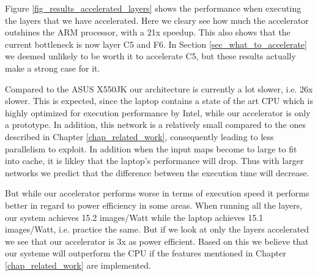Figure \ref{fig_results_accelerated_layers} shows the performance when executing the layers that we have accelerated. Here we cleary see how much the accelerator outshines the ARM processor, with a 21x speedup. This also shows that the current bottleneck is now layer C5 and F6. In Section \ref{sec_what_to_accelerate} we deemed unlikely to be worth it to accelerate C5, but these results actually make a strong case for it. 

Compared to the ASUS X550JK our architecture is currently a lot slower, i.e. 26x slower. This is expected, since the laptop contains a state of the art CPU which is highly optimized for execution performance by Intel, while our accelerator is only a prototype. In addition, this network is a relatively small compared to the ones described in Chapter \ref{chap_related_work}, consequently leading to less parallelism to exploit. In addition when the input maps become to large to fit into cache, it is likley that the laptop's performance will drop. Thus with larger networks we predict that the difference between the execution time will decrease.

But while our accelerator performs worse in terms of execution speed it performs better in regard to power efficiency in some areas. When running all the layers, our system achieves 15.2 images/Watt while the laptop achieves 15.1 images/Watt, i.e. practice the same. But if we look at only the layers accelerated we see that our accelerator is 3x as power efficient. Based on this we believe that our systeme will outperform the CPU if the features mentioned in Chapter \ref{chap_related_work} are implemented.  
